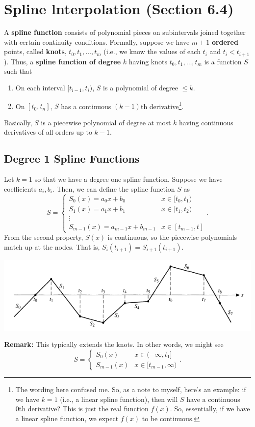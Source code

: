 \documentclass[letterpaper]{article}
\begin{document}
\section{Spline lnterpolation (Section 6.4)}
A \textbf{spline function} consists of polynomial pieces on subintervals joined together with certain continuity conditions. Formally, suppose we have $m + 1$ \textbf{ordered} points, called \textbf{knots}, $t_0, t_1, \hdots, t_m$ (i.e., we know the values of each $t_i$ and $t_i < t_{i + 1}$). Thus, a \textbf{spline function of degree} $k$ having knots $t_0, t_1, \hdots, t_m$ is a function $S$ such that 
\begin{enumerate}
    \item On each interval $[t_{i - 1}, t_i)$, $S$ is a polynomial of degree $\leq k$.
    \item On $[t_0, t_n]$, $S$ has a continuous $(k - 1)$th derivative\footnote{The wording here confused me. So, as a note to myself, here's an example: if we have $k = 1$ (i.e., a linear spline function), then will $S$ have a continuous 0th derivative? This is just the real function $f(x)$. So, essentially, if we have a linear spline function, we expect $f(x)$ to be continuous.}.
\end{enumerate}
Basically, $S$ is a piecewise polynomial of degree at most $k$ having continuous derivatives of all orders up to $k - 1$. 

\subsection{Degree 1 Spline Functions}
Let $k = 1$ so that we have a degree one spline function. Suppose we have coefficients $a_i, b_i$. Then, we can define the spline function $S$ as 
\[S = \begin{cases}
    S_{0}(x) = a_0 x + b_0 & x \in [t_0, t_1) \\ 
    S_{1}(x) = a_1 x + b_1 & x \in [t_1, t_2) \\ 
    \vdots \\ 
    S_{m - 1}(x) = a_{m - 1}x + b_{m - 1} & x \in [t_{m - 1}, t]
\end{cases}.\]
From the second property, $S(x)$ is continuous, so the piecewise polynomials match up at the nodes. That is, $\boxed{S_{i}(t_{i + 1}) = S_{i + 1}(t_{i + 1}).}$
\begin{center}
    \includegraphics[scale=0.6]{../assets/spline.png}
\end{center}
\textbf{Remark:} This typically extends the knots. In other words, we might see 
\[S = \begin{cases}
    S_{0}(x) & x \in (-\infty, t_1] \\ 
    S_{m - 1}(x) & x \in [t_{m - 1}, \infty)
\end{cases}.\]
\end{document}
